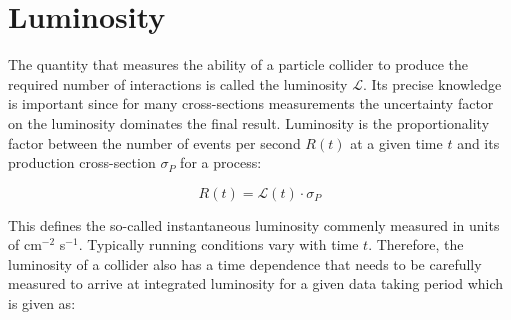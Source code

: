 


%






\section{Luminosity}

The quantity that measures the ability of a particle collider to produce the required number of interactions is called the luminosity $\mathcal{L}$. Its precise knowledge is important since for many cross-sections measurements the uncertainty factor on the luminosity dominates the final result. Luminosity is the proportionality factor between the number of events per second $R(t)$ at a given time $t$ and its production cross-section $\sigma_{P}$ for a process:

\begin{equation} \label{eq:rate}
R(t) = \mathcal{L}(t) \cdot \sigma_{P}
\end{equation}

This defines the so-called instantaneous luminosity commenly measured in units of cm$^{-2}$ s$^{-1}$. Typically running conditions vary with time $t$. Therefore, the luminosity of a collider also has a time dependence that needs to be carefully measured to arrive at integrated luminosity for a given data taking period which is given as:

